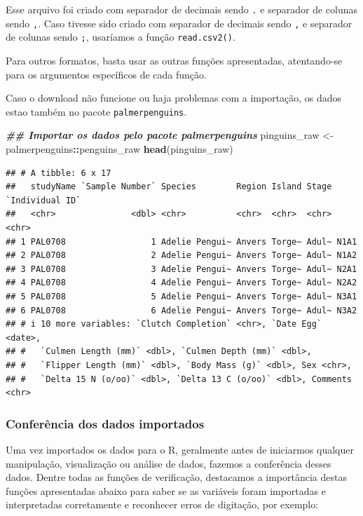 \documentclass[
]{article}
\newenvironment{Shaded}{\begin{snugshade}}{\end{snugshade}}
\newcommand{\DocumentationTok}[1]{\textcolor[rgb]{0.56,0.35,0.01}{\textbf{\textit{#1}}}}
\newcommand{\FunctionTok}[1]{\textcolor[rgb]{0.13,0.29,0.53}{\textbf{#1}}}
\newcommand{\NormalTok}[1]{#1}
\newcommand{\OtherTok}[1]{\textcolor[rgb]{0.56,0.35,0.01}{#1}}
\newcommand{\SpecialCharTok}[1]{\textcolor[rgb]{0.81,0.36,0.00}{\textbf{#1}}}
\begin{document}
Esse arquivo foi criado com separador de decimais sendo \texttt{.} e separador de colunas sendo \texttt{,}. Caso tivesse sido criado com separador de decimais sendo \texttt{,} e separador de colunas sendo \texttt{;}, usaríamos a função \texttt{read.csv2()}.

Para outros formatos, basta usar as outras funções apresentadas, atentando-se para os argumentos específicos de cada função.

Caso o download não funcione ou haja problemas com a importação, os dados estao também no pacote \texttt{palmerpenguins}.

\begin{Shaded}
\begin{Highlighting}[]
\DocumentationTok{\#\# Importar os dados pelo pacote palmerpenguins}
\NormalTok{pinguins\_raw }\OtherTok{\textless{}{-}}\NormalTok{ palmerpenguins}\SpecialCharTok{::}\NormalTok{penguins\_raw}
\FunctionTok{head}\NormalTok{(pinguins\_raw)}
\end{Highlighting}
\end{Shaded}

\begin{verbatim}
## # A tibble: 6 x 17
##   studyName `Sample Number` Species        Region Island Stage `Individual ID`
##   <chr>               <dbl> <chr>          <chr>  <chr>  <chr> <chr>          
## 1 PAL0708                 1 Adelie Pengui~ Anvers Torge~ Adul~ N1A1           
## 2 PAL0708                 2 Adelie Pengui~ Anvers Torge~ Adul~ N1A2           
## 3 PAL0708                 3 Adelie Pengui~ Anvers Torge~ Adul~ N2A1           
## 4 PAL0708                 4 Adelie Pengui~ Anvers Torge~ Adul~ N2A2           
## 5 PAL0708                 5 Adelie Pengui~ Anvers Torge~ Adul~ N3A1           
## 6 PAL0708                 6 Adelie Pengui~ Anvers Torge~ Adul~ N3A2           
## # i 10 more variables: `Clutch Completion` <chr>, `Date Egg` <date>,
## #   `Culmen Length (mm)` <dbl>, `Culmen Depth (mm)` <dbl>,
## #   `Flipper Length (mm)` <dbl>, `Body Mass (g)` <dbl>, Sex <chr>,
## #   `Delta 15 N (o/oo)` <dbl>, `Delta 13 C (o/oo)` <dbl>, Comments <chr>
\end{verbatim}

\hypertarget{conferuxeancia-dos-dados-importados}{%
\subsubsection{Conferência dos dados importados}\label{conferuxeancia-dos-dados-importados}}

Uma vez importados os dados para o R, geralmente antes de iniciarmos qualquer manipulação, visualização ou análise de dados, fazemos a conferência desses dados. Dentre todas as funções de verificação, destacamos a importância destas funções apresentadas abaixo para saber se as variáveis foram importadas e interpretadas corretamente e reconhecer erros de digitação, por exemplo:
\end{document}
